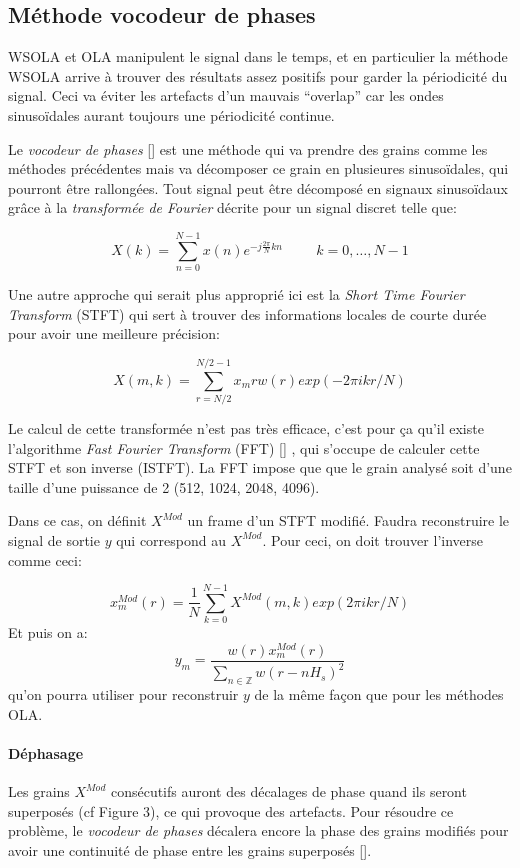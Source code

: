 \documentclass[letterpaper]{article}
\begin{document}
\subsection{Méthode vocodeur de phases}

WSOLA et OLA manipulent le signal dans le temps, et en particulier la méthode WSOLA arrive à trouver
des résultats assez positifs pour garder la périodicité du signal. Ceci va éviter les artefacts d'un
mauvais ``overlap'' car les ondes sinusoïdales aurant toujours une périodicité continue.

Le \emph{vocodeur de phases} [\cite{Flanagan}] est une méthode qui va prendre des grains comme les méthodes précédentes
mais va décomposer ce grain en plusieures sinusoïdales, qui pourront être rallongées. Tout signal peut
être décomposé en signaux sinusoïdaux grâce à la \emph{transformée de Fourier} décrite pour un
signal discret telle que:

$$ X(k) = \sum^{N-1}_{n=0} x(n)e^{-j\frac{2 \pi}{N}kn}  \hspace{1cm}  k = 0 , \dots,N-1$$

Une autre approche qui serait plus approprié ici est la \emph{Short Time Fourier Transform} (STFT)
qui sert à trouver des informations locales de courte durée pour avoir une meilleure précision:

$$ X(m,k) = \sum^{N / 2 - 1}_{ r = N/2} x_m{r} w(r) exp(-2\pi i k r / N)$$

Le calcul de cette transformée n'est pas très efficace, c'est pour ça qu'il existe l'algorithme
\emph{Fast Fourier Transform} (FFT)  [\cite{FFT}] , qui s'occupe de calculer cette STFT et son
inverse (ISTFT). La FFT impose que que le grain analysé soit d'une taille d'une puissance de 2
(512, 1024, 2048, 4096).

Dans ce cas, on définit $X^{Mod}$ un frame d'un STFT modifié. Faudra reconstruire le signal de sortie
$y$ qui correspond au $X^{Mod}$. Pour ceci, on doit trouver l'inverse comme ceci:

$$x_m^{Mod}(r) = \frac{1}{N} \sum_{k=0}^{N-1} X^{Mod}(m,k) exp(2\pi ikr / N)$$
Et puis on a:
$$y_m = \frac{w(r) x_m^{Mod}(r)}{\sum_{n \in \mathbb{Z}} w(r - nH_s)^2}$$
qu'on pourra utiliser pour reconstruir $y$ de la même façon que pour les méthodes OLA.

\paragraph{Déphasage} Les grains $X^{Mod}$ consécutifs auront des décalages de phase quand ils seront
superposés (cf Figure 3),
ce qui provoque des artefacts. Pour résoudre ce problème, le \emph{vocodeur de phases} décalera encore
la phase des grains modifiés pour avoir une continuité de phase entre les grains superposés [\cite{PHASEVOCODER}].
\end{document}
